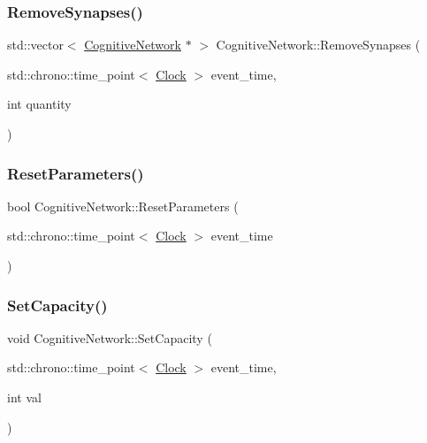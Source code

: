 \mbox{\label{classCognitiveNetwork_a87d6628f388baed1edb8efda9062c443}} 
\subsubsection{\texorpdfstring{Remove\+Synapses()}{RemoveSynapses()}}
{\footnotesize\ttfamily std\+::vector$<$ \mbox{\hyperlink{classCognitiveNetwork}{Cognitive\+Network}} $\ast$ $>$ Cognitive\+Network\+::\+Remove\+Synapses (\begin{DoxyParamCaption}\item[{std\+::chrono\+::time\+\_\+point$<$ \mbox{\hyperlink{universe_8h_a0ef8d951d1ca5ab3cfaf7ab4c7a6fd80}{Clock}} $>$}]{event\+\_\+time,  }\item[{int}]{quantity }\end{DoxyParamCaption})}

\mbox{\label{classCognitiveNetwork_a8af8ed2605263e57a32e457aba2af99d}} 
\subsubsection{\texorpdfstring{Reset\+Parameters()}{ResetParameters()}}
{\footnotesize\ttfamily bool Cognitive\+Network\+::\+Reset\+Parameters (\begin{DoxyParamCaption}\item[{std\+::chrono\+::time\+\_\+point$<$ \mbox{\hyperlink{universe_8h_a0ef8d951d1ca5ab3cfaf7ab4c7a6fd80}{Clock}} $>$}]{event\+\_\+time }\end{DoxyParamCaption})}

\mbox{\label{classCognitiveNetwork_a055b3711835b8d134356298f8975f04d}} 
\subsubsection{\texorpdfstring{Set\+Capacity()}{SetCapacity()}}
{\footnotesize\ttfamily void Cognitive\+Network\+::\+Set\+Capacity (\begin{DoxyParamCaption}\item[{std\+::chrono\+::time\+\_\+point$<$ \mbox{\hyperlink{universe_8h_a0ef8d951d1ca5ab3cfaf7ab4c7a6fd80}{Clock}} $>$}]{event\+\_\+time,  }\item[{int}]{val }\end{DoxyParamCaption})\hspace{0.3cm}{\ttfamily [inline]}}

